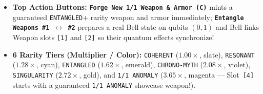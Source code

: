 \documentclass[10pt,letterpaper]{article}
\begin{document}
\begin{itemize}[leftmargin=1.5em, itemsep=1.5pt]
  \item \textbf{Top Action Buttons:} \textbf{\texttt{Forge New 1/1 Weapon \& Armor (C)}} mints a guaranteed \texttt{ENTANGLED}+ rarity weapon and armor immediately; \textbf{\texttt{Entangle Weapons \#1 $\leftrightarrow$ \#2}} prepares a real Bell state on qubits $(0,1)$ and Bell-links Weapon slots \texttt{[1]} and \texttt{[2]} so their quantum effects synchronize!
  \item \textbf{6 Rarity Tiers (Multiplier / Color):} \texttt{COHERENT} ($1.00\times$, slate), \texttt{RESONANT} ($1.28\times$, cyan), \texttt{ENTANGLED} ($1.62\times$, emerald), \texttt{CHRONO-MYTH} ($2.08\times$, violet), \texttt{SINGULARITY} ($2.72\times$, gold), and \texttt{1/1 ANOMALY} ($3.65\times$, magenta --- Slot~\texttt{[4]} starts with a guaranteed \texttt{1/1 ANOMALY} showcase weapon!).
\end{itemize}
\end{document}
